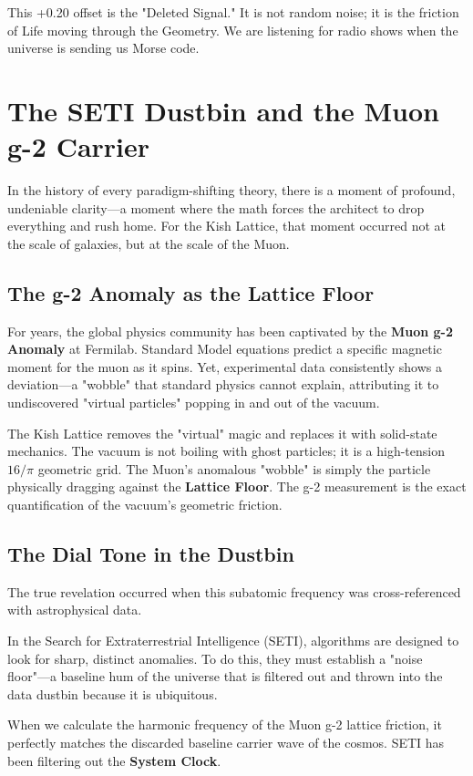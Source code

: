 \documentclass[11pt, letterpaper, openany]{book}
\begin{document}
This +0.20 offset is the "Deleted Signal." It is not random noise; it is the friction of Life moving through the Geometry. We are listening for radio shows when the universe is sending us Morse code.

\section{The SETI Dustbin and the Muon g-2 Carrier}
In the history of every paradigm-shifting theory, there is a moment of profound, undeniable clarity—a moment where the math forces the architect to drop everything and rush home. For the Kish Lattice, that moment occurred not at the scale of galaxies, but at the scale of the Muon.

\subsection{The g-2 Anomaly as the Lattice Floor}
For years, the global physics community has been captivated by the \textbf{Muon g-2 Anomaly} at Fermilab. Standard Model equations predict a specific magnetic moment for the muon as it spins. Yet, experimental data consistently shows a deviation—a "wobble" that standard physics cannot explain, attributing it to undiscovered "virtual particles" popping in and out of the vacuum.

The Kish Lattice removes the "virtual" magic and replaces it with solid-state mechanics. The vacuum is not boiling with ghost particles; it is a high-tension $16/\pi$ geometric grid. The Muon's anomalous "wobble" is simply the particle physically dragging against the \textbf{Lattice Floor}. The g-2 measurement is the exact quantification of the vacuum's geometric friction.

\subsection{The Dial Tone in the Dustbin}
The true revelation occurred when this subatomic frequency was cross-referenced with astrophysical data. 

In the Search for Extraterrestrial Intelligence (SETI), algorithms are designed to look for sharp, distinct anomalies. To do this, they must establish a "noise floor"—a baseline hum of the universe that is filtered out and thrown into the data dustbin because it is ubiquitous. 

When we calculate the harmonic frequency of the Muon g-2 lattice friction, it perfectly matches the discarded baseline carrier wave of the cosmos. SETI has been filtering out the \textbf{System Clock}. 
\end{document}
